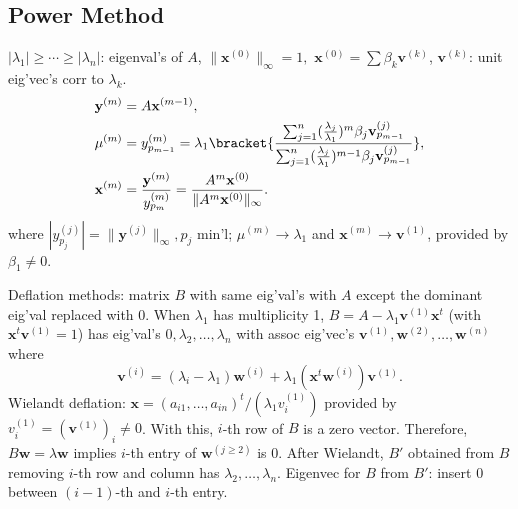 \documentclass[b4paper,10pt]{memoir}
\begin{document}
\begin{multicols*}{3}
    \section{Power Method}
    \s $|\lambda_1|\ge\cdots \ge |\lambda_n|$: eigenval's of $A$, $\|\mathbf x^{(0)}\|_\infty = 1,$ $\mathbf x^{(0)} = \sum \beta_k \mathbf v^{(k)}$, $\mathbf v^{(k)}$: unit eig'vec's corr to $\lambda_k$.
    \begin{align*}
        \mathbf y^{(m)} &= A\mathbf x^{(m-1)},\\
        \mu^{(m)} &= y_{p_{m-1}}^{(m)}= \lambda_1 \bracket{\frac{ \sum_{j=1}^n (\frac{\lambda_j}{\lambda_1})^m\beta_j \mathbf v_{p_{m-1}}^{(j)} } { \sum_{j=1}^n (\frac{\lambda_j}{\lambda_1})^{m-1}\beta_j \mathbf v_{p_{m-1}}^{(j)} }  },\\
        \mathbf x^{(m)} &= \frac{\mathbf y^{(m)}}{y_{p_m}^{(m)}} = \frac{A^m \mathbf x^{(0)}}{\|A^m \mathbf x^{(0)}\|_\infty}.
    \end{align*}
    where $|y_{p_j}^{(j)}| = \|\mathbf y^{(j)}\|_\infty, p_j\text{ min'l}$; $\mu^{(m)} \to \lambda_1$ and $\mathbf x^{(m)} \to \mathbf v^{(1)}$, provided by $\beta_1\ne 0$. \nl
    \iffalse
    \s Power method to $(A-qI)^{-1}$:
    \[ \mu^{(m)} = \frac 1{\lambda_k - q}\bracket{\frac{ \sum_{j=1}^n (\frac{\lambda_k-q}{\lambda_j-q})^m\beta_j \mathbf v_{p_{m-1}}^{(j)} } { \sum_{j=1}^n (\frac{\lambda_k-q}{\lambda_j-q})^{m-1}\beta_j \mathbf v_{p_{m-1}}^{(j)} }  } \]
    where $k$ satisfying
    \[ \frac 1{|\lambda_k-q|} = \max_{1\le i\le n} \frac 1{|\lambda_k-q|} \]
    is known. $q + 1/\mu^{(m)}\to\lambda_k$.
    \fi
    \s Deflation methods: matrix $B$ with same eig'val's with $A$ except the dominant eig'val replaced with 0.\nl
    \s When $\lambda_1$ has multiplicity 1, $B=A-\lambda_1 \mathbf v^{(1)}\mathbf x^t$ (with $\mathbf x^t\mathbf v^{(1)} = 1$)
    has eig'val's $0,\lambda_2,\dots,\lambda_n$ with assoc eig'vec's $\mathbf v^{(1)},\mathbf w^{(2)},\dots,\mathbf w^{(n)}$ where
    \[ \mathbf v^{(i)} = (\lambda_i-\lambda_1)\mathbf w^{(i)}+\lambda_1 (\mathbf x^t\mathbf w^{(i)})\mathbf v^{(1)}. \]
    \s Wielandt deflation: $\mathbf x = (a_{i1},\dots,a_{in})^t / (\lambda_1 v_i^{(1)})$ provided by $v_i^{(1)} = (\mathbf v^{(1)})_i\ne 0$. With this, $i$-th row of $B$ is a zero vector. Therefore, $B\mathbf w = \lambda\mathbf w$ implies $i$-th entry of $\mathbf w^{(j\ge 2)}$ is 0.
    \s After Wielandt, $B'$ obtained from $B$ removing $i$-th row and column has $\lambda_2,\dots,\lambda_n$. \nl
    \s Eigenvec for $B$ from $B'$: insert 0 between $(i-1)$-th and $i$-th entry.
\end{multicols*}
\end{document}

